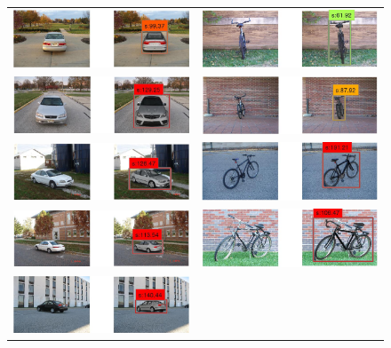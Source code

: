 \documentclass[10pt,twocolumn,letterpaper]{article}
\begin{document}
\begin{figure}[h]
\begin{tabular}{|c|c|}
  \includegraphics[width=0.40\linewidth]{supp/car1.png} &
  \includegraphics[width=0.40\linewidth]{supp/bicycle11.png} \\
  \includegraphics[width=0.40\linewidth]{supp/car8.png} &
  \includegraphics[width=0.40\linewidth]{supp/bicycle12.png} \\
  \includegraphics[width=0.40\linewidth]{supp/car20.png} & 
  \includegraphics[width=0.40\linewidth]{supp/bicycle15.png} \\
  \includegraphics[width=0.40\linewidth]{supp/car31.png} & 
  \includegraphics[width=0.40\linewidth]{supp/bicycle10.png} \\
  \includegraphics[width=0.40\linewidth]{supp/car33.png} & 

\end{tabular}
\end{figure}
\end{document}
